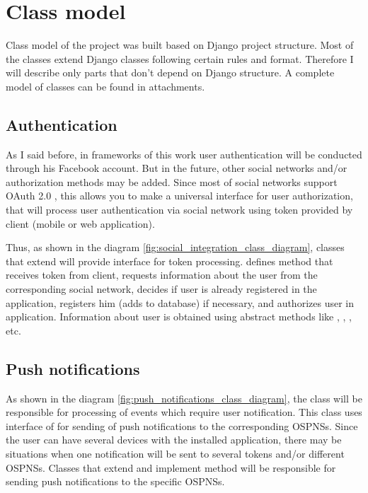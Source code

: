\section{Class model}
Class model of the project was built based on Django project structure. Most of the classes extend Django classes
following certain rules and format. Therefore I will describe only parts that don't depend on Django structure.
A complete model of classes can be found in attachments.

\subsection{Authentication}
As I said before, in frameworks of this work user authentication will be conducted through his Facebook account. But
in the future, other social networks and/or authorization methods may be added. Since most of social networks support
OAuth 2.0 \cite{oauth}, this allows you to make a universal interface for user authorization, that will process
user authentication via social network using token provided by client (mobile or web application).

Thus, as shown in the diagram \ref{fig:social_integration_class_diagram}, classes that extend 
will provide interface for token processing.  defines method  that receives
token from client, requests information about the user from the corresponding social network, decides if user is already
registered in the application, registers him (adds to database) if necessary, and authorizes user in application.
Information about user is obtained using abstract methods like , ,
, etc.



\subsection{Push notifications}
As shown in the diagram \ref{fig:push_notifications_class_diagram}, the  class will be responsible
for processing of events which require user notification. This class uses interface of 
for sending of push notifications to the corresponding \ac{OSPNS}s. Since the user can have several devices with the
installed application, there may be situations when one notification will be sent to several tokens and/or different
\ac{OSPNS}s. Classes that extend  and implement method  will be
responsible for sending push notifications to the specific \ac{OSPNS}s.

